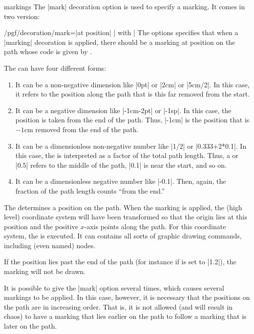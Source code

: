 \begin{decoration}{markings}
  The |mark| decoration option is used to specify a marking. It comes
  in two version:
  \begin{key}{/pgf/decoration/mark=|at position|
      | with |}
    The options specifies that when a |marking| decoration is applied,
    there should be a marking at position  on the path whose
    code is given by .

    The  can have four different forms:
    \begin{enumerate}
    \item It can be a non-negative dimension like |0pt| or |2cm| or
      |5cm/2|. In this case, it refers to the position along the path
      that is this far removed from the start.
    \item It can be a negative dimension like |-1cm-2pt| or |-1sp|. In
      this case, the position is taken from the end of the path. Thus,
      |-1cm| is the position that is $-1$cm removed from the end of
      the path.
    \item It can be a dimensionless non-negative number like |1/2| or
      |0.333+2*0.1|. In this case, the  is interpreted as a
      factor of the total path length. Thus, a  or |0.5|
      refers to the middle of the path, |0.1| is near the start, and
      so on.
    \item It can be a dimensionless negative number like |-0.1|. Then,
      again, the fraction of the path length counts ``from the end.''
    \end{enumerate}

    The  determines a position on the path. When the marking
    is applied, the (high level) coordinate system will have been
    transformed so that the origin lies at this position and the
    positive $x$-axis points along the path. For this coordinate
    system, the  is executed. It can contains all sorts of
    graphic drawing commands, including (even named) nodes.

    If the position lies past the end of the path (for
    instance if  is set to |1.2|), the marking will not be
    drawn.

    It is possible to give the |mark| option several times, which
    causes several markings to be applied. In this case, however, it
    is necessary that the positions on the path are in increasing
    order. That is, it is not allowed (and will result in chaos) to
    have a marking that lies earlier on the path to follow a marking
    that is later on the path.


\end{key}
\end{decoration}
